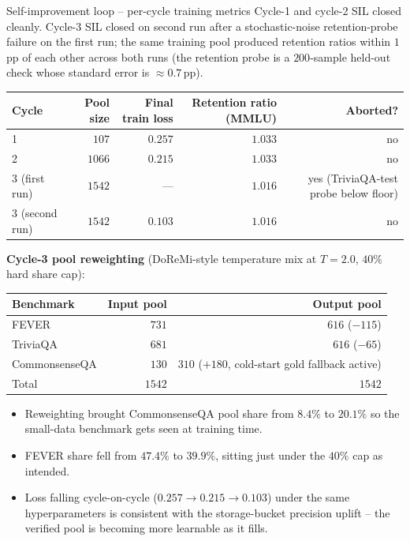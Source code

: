 \documentclass[10pt,aspectratio=169]{beamer}
\begin{document}
\begin{frame}{Self-improvement loop -- per-cycle training metrics}
  \scriptsize
  Cycle-1 and cycle-2 SIL closed cleanly. Cycle-3 SIL closed on second run after a stochastic-noise retention-probe failure on the first run; the same training pool produced retention ratios within $1\,$pp of each other across both runs (the retention probe is a $200$-sample held-out check whose standard error is $\approx 0.7\,$pp).

  \vspace{0.3em}
  \begin{tabular}{@{}lrrrr@{}}
    \toprule
    \textbf{Cycle} & \textbf{Pool size} & \textbf{Final train loss} & \textbf{Retention ratio (MMLU)} & \textbf{Aborted?} \\
    \midrule
    1 & $107$  & $0.257$ & $1.033$ & no \\
    2 & $1066$ & $0.215$ & $1.033$ & no \\
    3 (first run)  & $1542$ & --- & $1.016$ & yes (TriviaQA-test probe below floor) \\
    3 (second run) & $1542$ & $0.103$ & $1.016$ & no \\
    \bottomrule
  \end{tabular}

  \vspace{0.4em}
  \textbf{Cycle-3 pool reweighting} (DoReMi-style temperature mix at $T=2.0$, $40\%$ hard share cap):

  \vspace{0.2em}
  \begin{tabular}{@{}lrr@{}}
    \toprule
    \textbf{Benchmark} & \textbf{Input pool} & \textbf{Output pool} \\
    \midrule
    FEVER         & $731$ & $616$ ($-115$) \\
    TriviaQA      & $681$ & $616$ ($-65$) \\
    CommonsenseQA & $130$ & $310$ ($+180$, cold-start gold fallback active) \\
    \midrule
    Total & $1542$ & $1542$ \\
    \bottomrule
  \end{tabular}

  \vspace{0.4em}
  \begin{itemize}\scriptsize
    \item Reweighting brought CommonsenseQA pool share from $8.4\%$ to $20.1\%$ so the small-data benchmark gets seen at training time.
    \item FEVER share fell from $47.4\%$ to $39.9\%$, sitting just under the $40\%$ cap as intended.
    \item Loss falling cycle-on-cycle ($0.257 \to 0.215 \to 0.103$) under the same hyperparameters is consistent with the storage-bucket precision uplift -- the verified pool is becoming more learnable as it fills.
  \end{itemize}
\end{frame}
\end{document}
